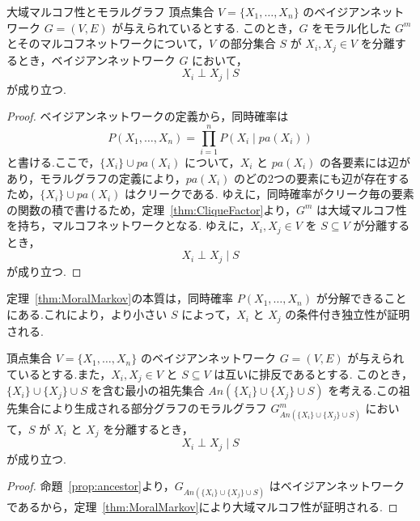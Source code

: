 \documentclass[uplatex, dvipdfmx]{jsarticle}
\begin{document}
\begin{thm}[label={thm:MoralMarkov}]{大域マルコフ性とモラルグラフ}
  頂点集合 $V = \{X_1, \dots, X_n\}$ のベイジアンネットワーク $G = (V, E)$ が与えられているとする.
  このとき，$G$ をモラル化した $G^m$ とそのマルコフネットワークについて，$V$ の部分集合 $S$ が $X_i, X_j \in V$ を分離するとき，ベイジアンネットワーク $G$ において，
  \begin{equation}
      X_i \perp X_j \mid S
  \end{equation}
  が成り立つ.
\end{thm}

\begin{proof}
  ベイジアンネットワークの定義から，同時確率は
  \begin{equation}
      P(X_1, \dots, X_n) = \prod_{i=1}^n P(X_i \mid pa(X_i))
  \end{equation}
  と書ける.ここで，$\{X_i\} \cup pa(X_i)$ について，$X_i$ と $pa(X_i)$ の各要素には辺があり，モラルグラフの定義により，$pa(X_i)$ のどの2つの要素にも辺が存在するため，$\{X_i\} \cup pa(X_i)$ はクリークである.
  ゆえに，同時確率がクリーク毎の要素の関数の積で書けるため，定理~\ref{thm:CliqueFactor}より，$G^m$ は大域マルコフ性を持ち，マルコフネットワークとなる.
  ゆえに，$X_i, X_j \in V$ を $S \subseteq V$ が分離するとき，
  \begin{equation}
      X_i \perp X_j \mid S
  \end{equation}
  が成り立つ.
\end{proof}

定理~\ref{thm:MoralMarkov}の本質は，同時確率 $P(X_1, \dots, X_n)$ が分解できることにある.これにより，より小さい $S$ によって，$X_i$ と $X_j$ の条件付き独立性が証明される.

\begin{cor}[label={cor:Markov}]{}
  頂点集合 $V = \{X_1, \dots, X_n\}$ のベイジアンネットワーク $G = (V, E)$ が与えられているとする.また，$X_i, X_j \in V$ と $S \subseteq V$ は互いに排反であるとする.
  このとき，$\{X_i\} \cup \{X_j\} \cup S$ を含む最小の祖先集合 $An(\{X_i\} \cup \{X_j\} \cup S)$ を考える.この祖先集合により生成される部分グラフのモラルグラフ $G^m_{An(\{X_i\} \cup \{X_j\} \cup S)}$ において，$S$ が $X_i$ と $X_j$ を分離するとき，
  \begin{equation}
      X_i \perp X_j \mid S
  \end{equation}
  が成り立つ.
\end{cor}

\begin{proof}
  命題~\ref{prop:ancestor}より，$G_{An(\{X_i\} \cup \{X_j\} \cup S)}$ はベイジアンネットワークであるから，定理~\ref{thm:MoralMarkov}により大域マルコフ性が証明される.
\end{proof}
\end{document}
